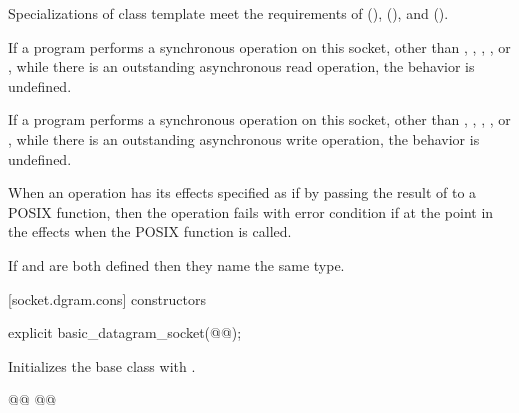 \pnum
Specializations of class template  meet the requirements of  (),  (), and  ().

\pnum
If a program performs a synchronous operation on this socket, other than , , , , or , while there is an outstanding asynchronous read operation, the behavior is undefined.

\pnum
If a program performs a synchronous operation on this socket, other than , , , , or , while there is an outstanding asynchronous write operation, the behavior is undefined.

\pnum
When an operation has its effects specified as if by passing the result of  to a POSIX function, then the operation fails with error condition  if  at the point in the effects when the POSIX function is called.

\pnum
If  and 
are both defined then they name the same type.

[socket.dgram.cons]{ constructors}

\begin{itemdecl}
explicit basic_datagram_socket(@@);
\end{itemdecl}

\begin{itemdescr}
\pnum
\effects Initializes the base class with .
\end{itemdescr}

\begin{itemdecl}
@@
@@
\end{itemdecl}

\begin{itemdescr}
\addedpnum
{}

\addedpnum
{}
\end{itemdescr}

